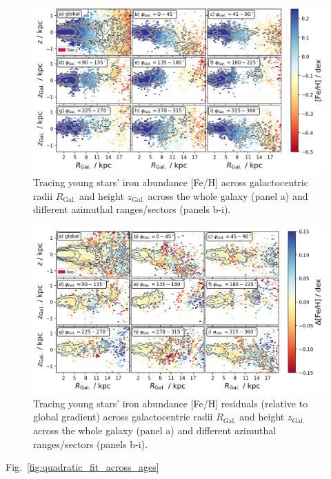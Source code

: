 \documentclass[fleqn,usenatbib]{mnras}
\begin{document}
\begin{figure}
    \centering
    \includegraphics[width=\columnwidth]{figures/tracing_fe_h_young_stars_in_angles.png}
    \caption{Tracing young stars' iron abundance [Fe/H] across galactocentric radii $R_\mathrm{Gal.}$ and height $z_\mathrm{Gal.}$ across the whole galaxy (panel a) and different azimuthal ranges/sectors (panels b-i).}
    \label{fig:tracing_fe_h_young_stars_in_angles}
\end{figure}

\begin{figure}
    \centering
    \includegraphics[width=\columnwidth]{figures/tracing_fe_h_residuals_young_stars_in_angles.png}
    \caption{Tracing young stars' iron abundance [Fe/H] residuals (relative to global gradient) across galactocentric radii $R_\mathrm{Gal.}$ and height $z_\mathrm{Gal.}$ across the whole galaxy (panel a) and different azimuthal ranges/sectors (panels b-i).}
    \label{fig:tracing_fe_h_residuals_young_stars_in_angles}
\end{figure}

Fig.~\ref{fig:quadratic_fit_across_ages}
\end{document}
